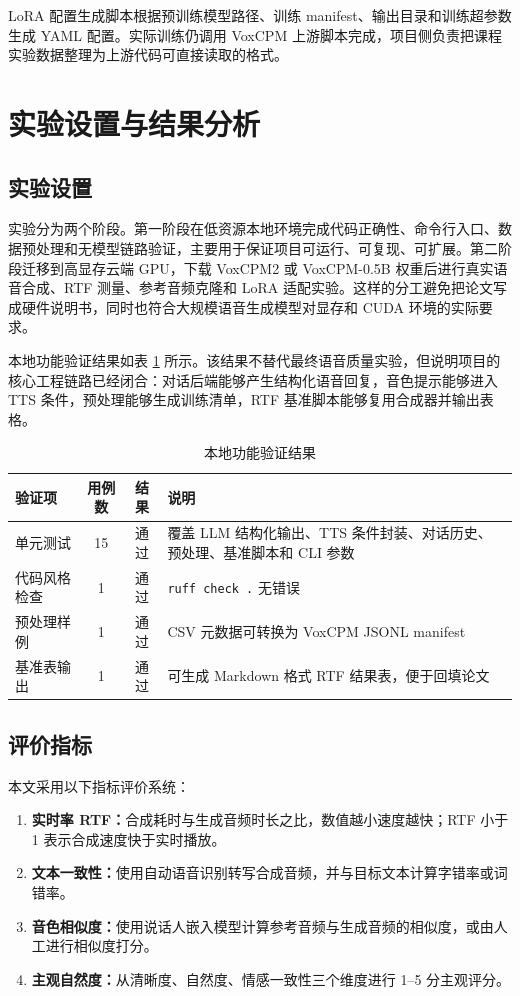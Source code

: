 \documentclass[UTF8,a4paper,12pt]{ctexart}
\begin{document}
LoRA 配置生成脚本根据预训练模型路径、训练 manifest、输出目录和训练超参数生成 YAML 配置。实际训练仍调用 VoxCPM 上游脚本完成，项目侧负责把课程实验数据整理为上游代码可直接读取的格式。

\section{实验设置与结果分析}
\subsection{实验设置}
实验分为两个阶段。第一阶段在低资源本地环境完成代码正确性、命令行入口、数据预处理和无模型链路验证，主要用于保证项目可运行、可复现、可扩展。第二阶段迁移到高显存云端 GPU，下载 VoxCPM2 或 VoxCPM-0.5B 权重后进行真实语音合成、RTF 测量、参考音频克隆和 LoRA 适配实验。这样的分工避免把论文写成硬件说明书，同时也符合大规模语音生成模型对显存和 CUDA 环境的实际要求。

本地功能验证结果如表 \ref{tab:functional-test} 所示。该结果不替代最终语音质量实验，但说明项目的核心工程链路已经闭合：对话后端能够产生结构化语音回复，音色提示能够进入 TTS 条件，预处理能够生成训练清单，RTF 基准脚本能够复用合成器并输出表格。

\begin{table}[htbp]
  \centering
  \caption{本地功能验证结果}
  \label{tab:functional-test}
  \begin{tabularx}{\linewidth}{lccX}
    \toprule
    验证项 & 用例数 & 结果 & 说明 \\
    \midrule
    单元测试 & 15 & 通过 & 覆盖 LLM 结构化输出、TTS 条件封装、对话历史、预处理、基准脚本和 CLI 参数 \\
    代码风格检查 & 1 & 通过 & \texttt{ruff check .} 无错误 \\
    预处理样例 & 1 & 通过 & CSV 元数据可转换为 VoxCPM JSONL manifest \\
    基准表输出 & 1 & 通过 & 可生成 Markdown 格式 RTF 结果表，便于回填论文 \\
    \bottomrule
  \end{tabularx}
\end{table}

\subsection{评价指标}
本文采用以下指标评价系统：
\begin{enumerate}
  \item \textbf{实时率 RTF：}合成耗时与生成音频时长之比，数值越小速度越快；RTF 小于 1 表示合成速度快于实时播放。
  \item \textbf{文本一致性：}使用自动语音识别转写合成音频，并与目标文本计算字错率或词错率。
  \item \textbf{音色相似度：}使用说话人嵌入模型计算参考音频与生成音频的相似度，或由人工进行相似度打分。
  \item \textbf{主观自然度：}从清晰度、自然度、情感一致性三个维度进行 1--5 分主观评分。
\end{enumerate}
\end{document}
